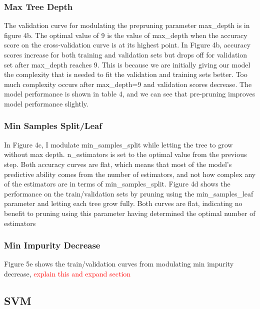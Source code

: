 \documentclass{article}
\newcommand\todo[1]{\textcolor{red}{#1}}
\begin{document}
\subsubsection*{Max Tree Depth}
The validation curve for modulating the prepruning parameter max\_depth is in figure 4b. The optimal value of 9 is the value of max\_depth when the accuracy score on the cross-validation curve is at its highest point. In Figure 4b, accuracy scores increase for both training and validation sets but drops off for validation set after max\_depth reaches 9. This is because we are initially giving our model the complexity that is needed to fit the validation and training sets better. Too much complexity occurs after max\_depth=9 and validation scores decrease. The model performance is shown in table 4, and we can see that pre-pruning improves model performance slightly. 

\subsubsection*{Min Samples Split/Leaf}
In Figure 4c, I modulate min\_samples\_split while letting the tree to grow without max depth. n\_estimators is set to the optimal value from the previous step. Both accuracy curves are flat, which means that most of the model's predictive ability comes from the number of estimators, and not how complex any of the estimators are in terms of min\_samples\_split. Figure 4d shows the performance on the train/validation sets by pruning using the min\_samples\_leaf parameter and letting each tree grow fully. Both curves are flat, indicating no benefit to pruning using this parameter having determined the optimal number of estimators

\subsubsection*{Min Impurity Decrease}
Figure 5e shows the train/validation curves from modulating min impurity decrease, \todo{explain this and expand section}



\subsection{SVM}
\end{document}
